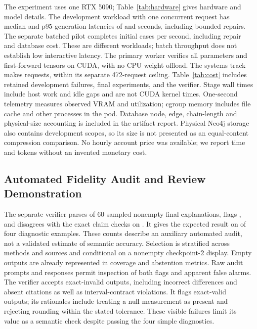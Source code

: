 The experiment uses one RTX 5090; Table~\ref{tab:hardware} gives hardware and model
details. The development workload with one concurrent request has median and p95 generation
latencies of \PilotInteractivePFifty{} and \PilotInteractivePNinetyFive{} seconds, including
bounded repairs. The separate batched pilot completes \PilotBatchRate{} initial
cases per second, including repair and database cost. These are different workloads;
batch throughput does not establish low interactive latency.
The primary worker verifies all parameters and first-forward tensors on CUDA,
with no CPU weight offload. The systems track makes \SystemsCalls{} requests,
within its separate 472-request ceiling. Table~\ref{tab:cost} includes retained
development failures, final experiments, and the verifier. Stage wall times
include host work and idle gaps and are not CUDA kernel times. One-second
telemetry measures observed VRAM and utilization; cgroup memory includes file
cache and other processes in the pod. Database node, edge, chain-length and
physical-size accounting is included in the artifact report. Physical Neo4j
storage also contains development scopes, so its size is not presented as an
equal-content compression comparison. No hourly account price was available;
we report time and tokens without an invented monetary cost.

\begin{table}[t]
\caption{Measured request and token accounting. Pilot rows include their separate
interactive workload. Systems pilot v1 includes requests from its failed scoring
smoke test. ``No usage'' counts attempts without returned token counts: their
server-side cost is unknown, not zero. Token sums include available usage only.
Wall time excludes package/model downloads and manuscript work.}
\label{tab:cost}
\centering\small\setlength{\tabcolsep}{2.8pt}

\end{table}

\subsection{Automated Fidelity Audit and Review Demonstration}

The separate verifier parses \AuditParsed{} of 60 sampled nonempty final
explanations, flags \AuditFlagged{}, and disagrees with the exact claim checks
on \AuditDisagreements{}. It gives the expected result on \AuditCalibration{}
of four diagnostic examples. These counts describe an auxiliary automated audit,
not a validated estimate of semantic accuracy. Selection is stratified across
methods and sources and conditional on a nonempty checkpoint-2 display. Empty
outputs are already represented in coverage and abstention metrics. Raw audit
prompts and responses permit inspection of both flags and apparent false alarms.
The verifier accepts \AuditAcceptedInvalid{} exact-invalid outputs, including
incorrect differences and absent citations as well as interval-contract violations.
It flags \AuditFlaggedValid{} exact-valid outputs; its rationales include treating
a null measurement as present and rejecting rounding within the stated tolerance.
These visible failures limit its value as a semantic check despite passing the
four simple diagnostics.

